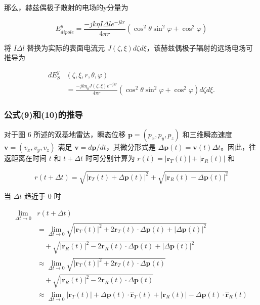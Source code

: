 \begin{TranslationNoMiniToc}
那么，赫兹偶极子散射的电场的y分量为

\begin{equation}
E_{dipole}^y = \frac{-jk\eta I \Delta l e^{-jkr}}{4\pi r}(\cos^2 \theta \sin^2 \varphi + \cos^2 \varphi)
\end{equation}

将 $I \Delta l$ 替换为实际的表面电流元 $J(\zeta, \xi)d\zeta d\xi$，该赫兹偶极子辐射的远场电场可推导为

\begin{equation}
\begin{aligned}
d E_S^y &(\zeta, \xi, r, \theta, \varphi) \\
&= \frac{-j k \eta_0 J(\zeta, \xi) e^{-j k r}}{4 \pi r} (\cos^2 \theta \sin^2 \varphi + \cos^2 \varphi) d \zeta d \xi.
\end{aligned}
\end{equation}

\subsubsection{公式(9)和(10)的推导}
对于图 6 所述的双基地雷达，瞬态位移 $\boldsymbol{p} = (p_x, p_y, p_z)$ 和三维瞬态速度 $\boldsymbol{v} = (v_x, v_y, v_z)$ 满足 $\boldsymbol{v} = d \boldsymbol{p}/dt$，其微分形式是 $\Delta \boldsymbol{p}(t) = \boldsymbol{v}(t) \Delta t$。因此，往返距离在时间 $t$ 和 $t + \Delta t$ 时可分别计算为 $r(t) = |\boldsymbol{r}_T(t)| + |\boldsymbol{r}_R(t)|$ 和

\begin{equation}
r(t + \Delta t) = \sqrt{|\boldsymbol{r}_T(t) + \Delta \boldsymbol{p}(t)|^2} + \sqrt{|\boldsymbol{r}_R(t) - \Delta \boldsymbol{p}(t)|^2}
\end{equation}

当 $\Delta t$ 趋近于 $0$ 时

\begin{equation}
\begin{aligned}
\lim_{\Delta t \to 0} &r(t + \Delta t) \\
&= \lim_{\Delta t \to 0} \sqrt{|\boldsymbol{r}_T(t)|^2 + 2 \boldsymbol{r}_T(t) \cdot \Delta \boldsymbol{p}(t) + |\Delta \boldsymbol{p}(t)|^2} \\
&\quad + \sqrt{|\boldsymbol{r}_R(t)|^2 - 2 \boldsymbol{r}_R(t) \cdot \Delta \boldsymbol{p}(t) + |\Delta \boldsymbol{p}(t)|^2} \\
&\approx \lim_{\Delta t \to 0} \sqrt{|\boldsymbol{r}_T(t)|^2 + 2 \boldsymbol{r}_T(t) \cdot \Delta \boldsymbol{p}(t)} \\
&\quad + \sqrt{|\boldsymbol{r}_R(t)|^2 - 2 \boldsymbol{r}_R(t) \cdot \Delta \boldsymbol{p}(t)} \\
&\approx \lim_{\Delta t \to 0} |\boldsymbol{r}_T(t)| + \Delta \boldsymbol{p}(t) \cdot \boldsymbol{\hat{r}}_T(t) + |\boldsymbol{r}_R(t)| - \Delta \boldsymbol{p}(t) \cdot \boldsymbol{\hat{r}}_R(t)
\end{aligned}
\end{equation}


\end{TranslationNoMiniToc}
